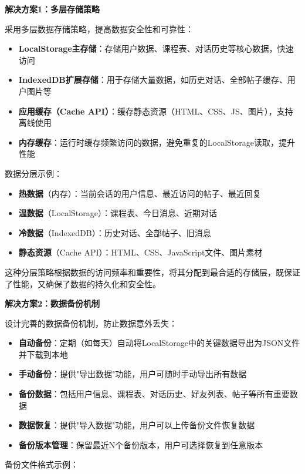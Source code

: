 \documentclass[12pt,a4paper]{article}
\begin{document}
\textbf{解决方案1：多层存储策略}

采用多层数据存储策略，提高数据安全性和可靠性：

\begin{itemize}
    \item \textbf{LocalStorage主存储}：存储用户数据、课程表、对话历史等核心数据，快速访问
    \item \textbf{IndexedDB扩展存储}：用于存储大量数据，如历史对话、全部帖子缓存、用户图片等
    \item \textbf{应用缓存（Cache API）}：缓存静态资源（HTML、CSS、JS、图片），支持离线使用
    \item \textbf{内存缓存}：运行时缓存频繁访问的数据，避免重复的LocalStorage读取，提升性能
\end{itemize}

数据分层示例：

\begin{itemize}
    \item \textbf{热数据}（内存）：当前会话的用户信息、最近访问的帖子、最近回复
    \item \textbf{温数据}（LocalStorage）：课程表、今日消息、近期对话
    \item \textbf{冷数据}（IndexedDB）：历史对话、全部帖子、旧消息
    \item \textbf{静态资源}（Cache API）：HTML、CSS、JavaScript文件、图片素材
\end{itemize}

这种分层策略根据数据的访问频率和重要性，将其分配到最合适的存储层，既保证了性能，又确保了数据的持久化和安全性。

\textbf{解决方案2：数据备份机制}

设计完善的数据备份机制，防止数据意外丢失：

\begin{itemize}
    \item \textbf{自动备份}：定期（如每天）自动将LocalStorage中的关键数据导出为JSON文件并下载到本地
    \item \textbf{手动备份}：提供"导出数据"功能，用户可随时手动导出所有数据
    \item \textbf{备份数据}：包括用户信息、课程表、对话历史、好友列表、帖子等所有重要数据
    \item \textbf{数据恢复}：提供"导入数据"功能，用户可以上传备份文件恢复数据
    \item \textbf{备份版本管理}：保留最近N个备份版本，用户可选择恢复到任意版本
\end{itemize}

备份文件格式示例：
\end{document}
